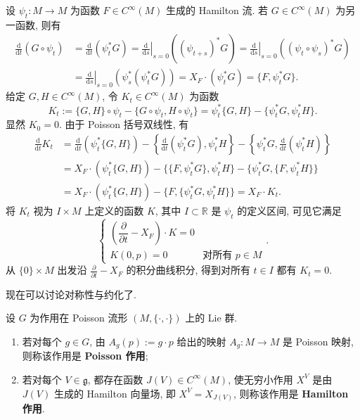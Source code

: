 \begin{RiemannProof}
设 $\psi_t:M\to M$ 为函数 $F\in C^\infty(M)$ 生成的 Hamilton 流. 若 $G\in C^\infty(M)$ 为另一函数, 则有
\begin{align*}
  \frac{\mathrm{d}}{\mathrm{d}t}(G\circ\psi_t)
  &=\frac{\mathrm{d}}{\mathrm{d}t}(\psi_t^*G)
    =\left.\frac{\mathrm{d}}{\mathrm{d}s}\right|_{s=0}((\psi_{t+s})^*G)
    =\left.\frac{\mathrm{d}}{\mathrm{d}s}\right|_{s=0}((\psi_t\circ\psi_s)^*G)\\
  &=\left.\frac{\mathrm{d}}{\mathrm{d}s}\right|_{s=0}(\psi_s^*(\psi_t^*G))
    =X_F\cdot(\psi_t^*G)=\{F,\psi_t^*G\}.
\end{align*}
给定 $G,H\in C^\infty(M)$, 令 $K_t\in C^\infty(M)$ 为函数
\[
  K_t:=\{G,H\}\circ\psi_t-\{G\circ\psi_t,H\circ\psi_t\}
      =\psi_t^*\{G,H\}-\{\psi_t^*G,\psi_t^*H\}.
\]
显然 $K_0=0$. 由于 Poisson 括号双线性, 有
\begin{align*}
  \frac{\mathrm{d}}{\mathrm{d}t}K_t
  &=\frac{\mathrm{d}}{\mathrm{d}t}(\psi_t^*\{G,H\})
    -\left\{\frac{\mathrm{d}}{\mathrm{d}t}(\psi_t^*G),\psi_t^*H\right\}
    -\left\{\psi_t^*G,\frac{\mathrm{d}}{\mathrm{d}t}(\psi_t^*H)\right\}\\
  &=X_F\cdot(\psi_t^*\{G,H\})-\{\{F,\psi_t^*G\},\psi_t^*H\}
    -\{\psi_t^*G,\{F,\psi_t^*H\}\}\\
  &=X_F\cdot(\psi_t^*\{G,H\})-\{F,\{\psi_t^*G,\psi_t^*H\}\}
    =X_F\cdot K_t.
\end{align*}
将 $K_t$ 视为 $I\times M$ 上定义的函数 $K$, 其中 $I\subset\mathbb{R}$ 是 $\psi_t$ 的定义区间, 可见它满足
\[
  \begin{cases}
     \left(\dfrac{\partial}{\partial t}-X_F\right)\cdot K=0\\
     K(0,p)=0 & \text{对所有 $p\in M$}
  \end{cases}.
\]
从 $\{0\}\times M$ 出发沿 $\frac{\partial}{\partial t}-X_F$ 的积分曲线积分, 得到对所有 $t\in I$ 都有 $K_t=0$.
\end{RiemannProof}

现在可以讨论对称性与约化了.

\begin{RiemannDefinition}\label{def:poisson-and-hamiltonian-actions}
设 $G$ 为作用在 Poisson 流形 $(M,\{\cdot,\cdot\})$ 上的 Lie 群.
\begin{enumerate}[label=(\arabic*),leftmargin=*]
\item 若对每个 $g\in G$, 由 $A_g(p):=g\cdot p$ 给出的映射 $A_g:M\to M$ 是 Poisson 映射, 则称该作用是 \textbf{Poisson 作用};
\item 若对每个 $V\in\mathfrak{g}$, 都存在函数 $J(V)\in C^\infty(M)$, 使无穷小作用 $X^V$ 是由 $J(V)$ 生成的 Hamilton 向量场, 即 $X^V=X_{J(V)}$, 则称该作用是 \textbf{Hamilton 作用}.
\end{enumerate}
\end{RiemannDefinition}

